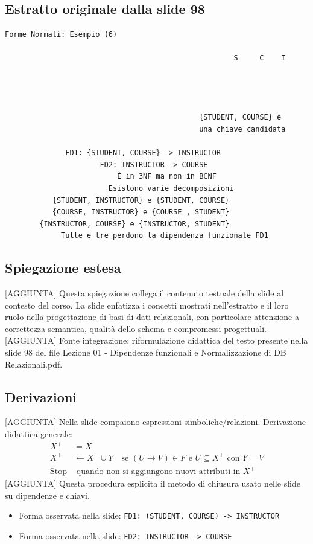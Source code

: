 \documentclass[11pt]{article}
\begin{document}
\subsection*{Estratto originale dalla slide 98}
\begin{lstlisting}
Forme Normali: Esempio (6)

                                                     S     C    I




                                             {STUDENT, COURSE} è
                                             una chiave candidata

              FD1: {STUDENT, COURSE} -> INSTRUCTOR
                      FD2: INSTRUCTOR -> COURSE
                          È in 3NF ma non in BCNF
                        Esistono varie decomposizioni
           {STUDENT, INSTRUCTOR} e {STUDENT, COURSE}
           {COURSE, INSTRUCTOR} e {COURSE , STUDENT}
        {INSTRUCTOR, COURSE} e {INSTRUCTOR, STUDENT}
             Tutte e tre perdono la dipendenza funzionale FD1
\end{lstlisting}
\subsection*{Spiegazione estesa}
[AGGIUNTA] Questa spiegazione collega il contenuto testuale della slide al contesto del corso. La slide enfatizza i concetti mostrati nell'estratto e il loro ruolo nella progettazione di basi di dati relazionali, con particolare attenzione a correttezza semantica, qualità dello schema e compromessi progettuali.
[AGGIUNTA] Fonte integrazione: riformulazione didattica del testo presente nella slide 98 del file Lezione 01 - Dipendenze funzionali e Normalizzazione di DB Relazionali.pdf.
\subsection*{Derivazioni}
[AGGIUNTA] Nella slide compaiono espressioni simboliche/relazioni. Derivazione didattica generale:
\begin{align*}
X^+ &= X \\
X^+ &\leftarrow X^+ \cup Y \quad \text{se } (U \to V) \in F \text{ e } U \subseteq X^+ \text{ con } Y=V \\
\text{Stop} &\text{ quando non si aggiungono nuovi attributi in } X^+
\end{align*}
[AGGIUNTA] Questa procedura esplicita il metodo di chiusura usato nelle slide su dipendenze e chiavi.
\begin{itemize}[leftmargin=*]
\item Forma osservata nella slide: \texttt{FD1: (STUDENT, COURSE) -> INSTRUCTOR}
\item Forma osservata nella slide: \texttt{FD2: INSTRUCTOR -> COURSE}
\end{itemize}
\end{document}
